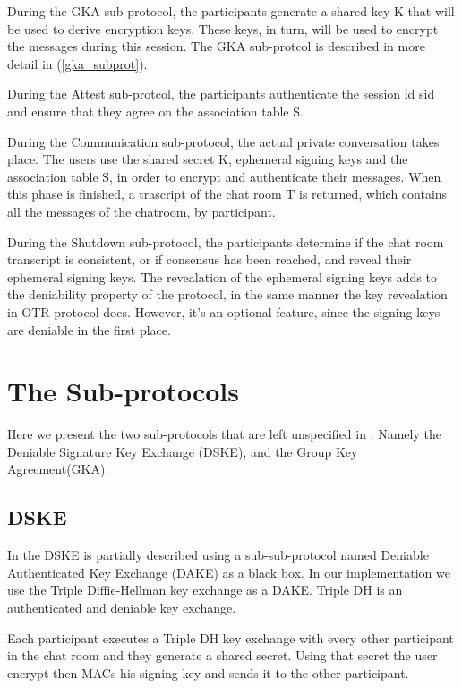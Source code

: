 \documentclass[]{article}
\begin{document}
During the GKA sub-protocol, the participants generate a shared key K that will be used to derive encryption keys.
These keys, in turn, will be used to encrypt the messages during this session.
The GKA sub-protcol is described in more detail in (\ref{gka_subprot}).

During the Attest sub-protcol, the participants authenticate the session id sid and ensure that they agree on the association table S.

During the Communication sub-protocol, the actual private conversation takes place.
The users use the shared secret K, ephemeral signing keys and the association table S, in order to encrypt and authenticate their messages.
When this phase is finished, a trascript of the chat room T is returned, which contains all the messages of the chatroom, by participant.

During the Shutdown sub-protocol, the participants determine if the chat room transcript is consistent, or if consensus has been reached, and reveal their ephemeral signing keys.
The revealation of the ephemeral signing keys adds to the deniability property of the protocol, in the same manner the key revealation in OTR protocol does.
However, it's an optional feature, since the signing keys are deniable in the first place.

\section{The Sub-protocols}

Here we present the two sub-protocols that are left unspecified in \cite{mpotr}.
Namely the Deniable Signature Key Exchange (DSKE), and the Group Key Agreement(GKA).

\subsection{DSKE}
\label{dske_subprot}

In \cite{mpotr} the DSKE is partially described using a sub-sub-protocol named Deniable Authenticated Key Exchange (DAKE) as a black box.
In our implementation we use the Triple Diffie-Hellman key exchange as a DAKE.
Triple DH is an authenticated and deniable key exchange.

Each participant executes a Triple DH key exchange with every other participant in the chat room and they generate a shared secret.
Using that secret the user encrypt-then-MACs his signing key and sends it to the other participant.
\end{document}
